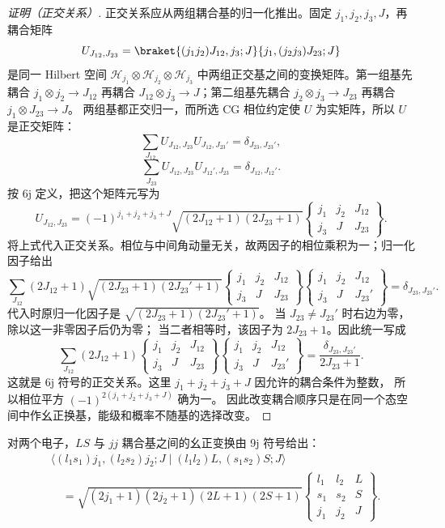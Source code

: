 \begin{proof}[证明（正交关系）]
正交关系应从两组耦合基的归一化推出。固定 $j_1,j_2,j_3,J$，再耦合矩阵
\[
U_{J_{12},J_{23}}=\braket{(j_1 j_2)J_{12},j_3;J}{j_1,(j_2 j_3)J_{23};J}
\]
是同一 Hilbert 空间 $\mathcal H_{j_1}\otimes\mathcal H_{j_2}\otimes\mathcal H_{j_3}$ 中两组正交基之间的变换矩阵。第一组基先耦合 $j_1\otimes j_2\to J_{12}$ 再耦合 $J_{12}\otimes j_3\to J$；第二组基先耦合 $j_2\otimes j_3\to J_{23}$ 再耦合 $j_1\otimes J_{23}\to J$。
两组基都正交归一，而所选 CG 相位约定使 $U$ 为实矩阵，所以 $U$ 是正交矩阵：
\[
\sum_{J_{12}}U_{J_{12},J_{23}}U_{J_{12},J_{23}'}=\delta_{J_{23},J_{23}'},
\]
\[
\sum_{J_{23}}U_{J_{12},J_{23}}U_{J_{12}',J_{23}}=\delta_{J_{12},J_{12}'}.
\]
按 6j 定义，把这个矩阵元写为
\[
U_{J_{12},J_{23}}=(-1)^{j_1+j_2+j_3+J}\sqrt{(2J_{12}+1)(2J_{23}+1)}
\begin{Bmatrix}j_1&j_2&J_{12}\\j_3&J&J_{23}\end{Bmatrix}.
\]
将上式代入正交关系。相位与中间角动量无关，故两因子的相位乘积为一；归一化因子给出
\[
\sum_{J_{12}}(2J_{12}+1)\sqrt{(2J_{23}+1)(2J_{23}'+1)}
\begin{Bmatrix}j_1&j_2&J_{12}\\j_3&J&J_{23}\end{Bmatrix}
\begin{Bmatrix}j_1&j_2&J_{12}\\j_3&J&J_{23}'\end{Bmatrix}
=\delta_{J_{23},J_{23}'}.
\]
代入时原归一化因子是 $\sqrt{(2J_{23}+1)(2J_{23}'+1)}$。
当 $J_{23}\ne J_{23}'$ 时右边为零，除以这一非零因子后仍为零；
当二者相等时，该因子为 $2J_{23}+1$。因此统一写成
\[
\sum_{J_{12}}(2J_{12}+1)
\begin{Bmatrix}j_1&j_2&J_{12}\\j_3&J&J_{23}\end{Bmatrix}
\begin{Bmatrix}j_1&j_2&J_{12}\\j_3&J&J_{23}'\end{Bmatrix}
=\frac{\delta_{J_{23},J_{23}'}}{2J_{23}+1}.
\]
这就是 6j 符号的正交关系。这里 $j_1+j_2+j_3+J$ 因允许的耦合条件为整数，
所以相位平方 $(-1)^{2(j_1+j_2+j_3+J)}$ 确为一。
因此改变耦合顺序只是在同一个态空间中作幺正换基，能级和概率不随基的选择改变。
\end{proof}\par\medskip
对两个电子，$LS$ 与 $jj$ 耦合基之间的幺正变换由 9j 符号给出：
\[
\begin{aligned}
&\langle(l_1s_1)j_1,(l_2s_2)j_2;J
\mid(l_1l_2)L,(s_1s_2)S;J\rangle\\
&\quad=\sqrt{(2j_1+1)(2j_2+1)(2L+1)(2S+1)}
\begin{Bmatrix}l_1&l_2&L\\s_1&s_2&S\\j_1&j_2&J\end{Bmatrix}.
\end{aligned}
\]
